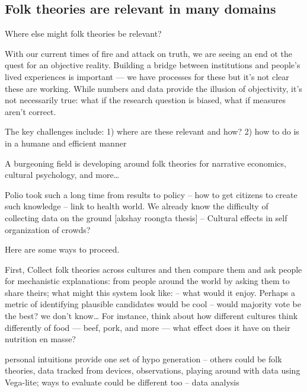 

\subsection{Folk theories are relevant in many domains}
Where else might folk theories be relevant?

With our current times of fire and attack on truth, we are seeing an end ot the quest for an objective reality. Building a bridge between institutions and people’s lived experiences is important — we have processes for these but it’s not clear these are working. While numbers and data provide the illusion of objectivity, it’s not necessarily true: what if the research question is biased, what if measures aren’t correct. 

The key challenges include: 1) where are these relevant and how? 2) how to do is in a humane and efficient manner

A burgeoning field is developing around folk theories for narrative economics, cultural psychology, and more… 

Polio took such a long time from results to policy --  how to get citizens to create such knowledge -- link to health world. We already know the difficulty of collecting data on the ground [akshay roongta thesis] -- Cultural effects in self organization of crowds?

Here are some ways to proceed.

First, Collect folk theories across cultures and then compare them and ask people for mechanistic explanations: from people around the world by asking them to share theirs; what might this system look like: -- what would it enjoy. Perhaps a metric of identifying plausible candidates would be cool -- would majority vote be the best? we don't know… For instance, think about how different cultures think differently of food — beef, pork, and more — what effect does it have on their nutrition en masse?

personal intuitions provide one set of hypo generation -- others could be folk theories, data tracked from devices, observations, playing around with data using Vega-lite; ways to evaluate could be different too -- data analysis




